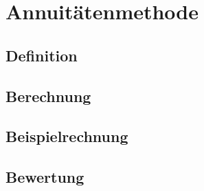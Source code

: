 \chapter{Annuitätenmethode}
\label{Annuitaetenmethode}

\section{Definition}

\section{Berechnung}

\section{Beispielrechnung}

\section{Bewertung}
